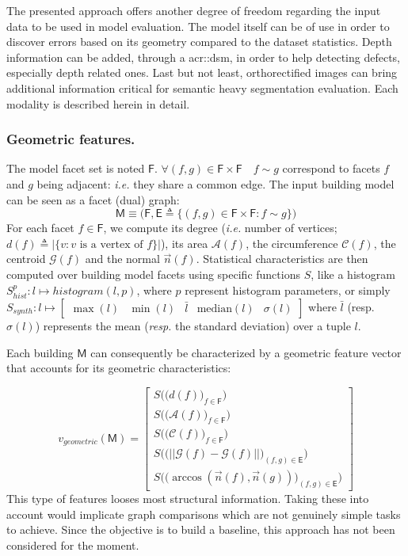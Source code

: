 \documentclass[runningheads]{llncs}
\begin{document}
The presented approach offers another degree of freedom regarding the input data to be used in model evaluation. The model itself can be of use in order to discover errors based on its geometry compared to the dataset statistics. Depth information can be added, through a \acrshort{acr::dsm}, in order to help detecting defects, especially depth related ones. Last but not least, orthorectified images can bring additional information critical for semantic heavy segmentation evaluation. Each modality is described herein in detail.

\subsubsection{Geometric features.}
The model facet set is noted $\mathsf{F}$. $\forall (f, g) \in \mathsf{F} \times \mathsf{F} \quad f \sim g$ correspond to facets $f$ and $g$ being adjacent: \textit{i.e.} they share a common edge. The input building model can be seen as a facet (dual) graph:
\begin{equation}
	\label{eq::model_graph}
	\mathsf{M} \equiv \Big(\mathsf{F}, \mathsf{E} \triangleq \big\{ (f, g) \in \mathsf{F} \times \mathsf{F} : f \sim g \big\} \Big)
\end{equation}
For each facet $f \in \mathsf{F}$, we compute its degree (\textit{i.e.} number of vertices; $d(f) \triangleq \vert\{v : v\text{ is a vertex of }f\}\vert$), its area $\mathscr{A}(f)$, the circumference $\mathscr{C}(f)$, the centroid $\mathscr{G}(f)$ and the normal $\vec{n}(f)$. Statistical characteristics are then computed over building model facets using specific functions $S$, like a histogram $S^p_{hist}: l \mapsto histogram(l, p)$, where $p$ represent histogram parameters, or simply $S_{synth}: l \mapsto \begin{bmatrix}
\max(l)& \min(l) & \bar{l} & \text{median}(l) & \sigma(l)
\end{bmatrix}$ where $\bar{l}$ (resp. $\sigma(l)$) represents the mean (\textit{resp.} the standard deviation) over a tuple $l$.

Each building $\mathsf{M}$ can consequently be characterized by a geometric feature vector that accounts for its geometric characteristics:

\begin{equation}
	\label{eq::geom_feat}
    v_{geometric}(\mathsf{M}) = \begin{bmatrix}
    	S \Big(\big(d(f)\big)_{f \in \mathsf{F}}\Big)\\
    	S \Big(\big(\mathscr{A}(f)\big)_{f \in \mathsf{F}}\Big)\\
    	S \Big(\big(\mathscr{C}(f)\big)_{f \in \mathsf{F}}\Big)\\
    	S \Big(\big( \vert\vert \mathscr{G}(f) - \mathscr{G}(f) \vert\vert \big)_{(f,g) \in \mathsf{E}}\Big)\\
    	S\Big(\big( \arccos(\vec{n}(f), \vec{n}(g)) \big)_{(f,g) \in \mathsf{E}}\Big)
    \end{bmatrix}
\end{equation}
This type of features looses most structural information. Taking these into account would implicate graph comparisons which are not genuinely simple tasks to achieve. Since the objective is to build a baseline, this approach has not been considered for the moment.
\end{document}
